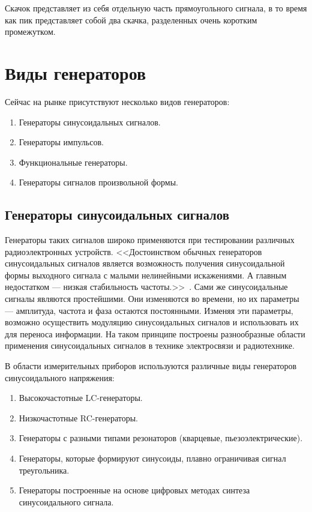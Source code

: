 Скачок представляет из себя отдельную часть прямоугольного сигнала, в то время как пик представляет собой два скачка, разделенных очень коротким промежутком.


\section{Виды генераторов}
Сейчас на рынке присутствуют несколько видов генераторов:
\begin{enumerate}
	\item Генераторы синусоидальных сигналов.
	\item Генераторы импульсов.
	\item Функциональные генераторы.
	\item Генераторы сигналов произвольной формы.
\end{enumerate}

\subsection{Генераторы синусоидальных сигналов}
Генераторы таких сигналов широко применяются при тестировании различных радиоэлектронных устройств. <<Достоинством обычных генераторов синусоидальных сигналов является возможность получения синусоидальной формы выходного сигнала с малыми нелинейными искажениями. А главным недостатком — низкая стабильность частоты.>>~\cite{dgs}. Сами же синусоидальные сигналы являются простейшими. Они изменяются во времени, но их параметры --- амплитуда, частота и фаза остаются постоянными. Изменяя эти параметры, возможно осуществить модуляцию синусоидальных сигналов и использовать их для переноса информации. На таком принципе построены разнообразные области применения синусоидальных сигналов в технике электросвязи и радиотехнике.

В области измерительных приборов используются различные виды генераторов синусоидального напряжения:

\begin{enumerate}
	\item Высокочастотные LC-генераторы.
	\item Низкочастотные RC-генераторы.
	\item Генераторы с разными типами резонаторов (кварцевые, пьезоэлектрические).
	\item Генераторы, которые формируют синусоиды, плавно ограничивая сигнал треугольника.
	\item Генераторы построенные на основе цифровых методах синтеза синусоидального сигнала.
\end{enumerate}

